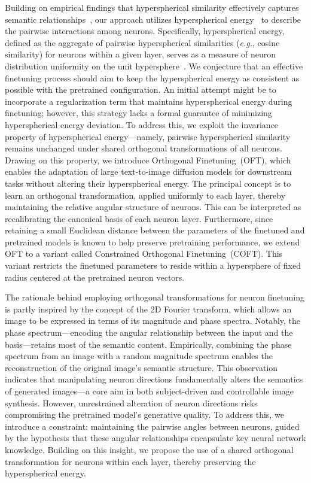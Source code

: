 Building on empirical findings that hyperspherical similarity effectively captures semantic relationships~\cite{liu2017deep,liu2018decoupled,chen2020angular}, our approach utilizes hyperspherical energy~\cite{liu2018learning} to describe the pairwise interactions among neurons. Specifically, hyperspherical energy, defined as the aggregate of pairwise hyperspherical similarities (\emph{e.g.}, cosine similarity) for neurons within a given layer, serves as a measure of neuron distribution uniformity on the unit hypersphere~\cite{liu2021learning}. We conjecture that an effective finetuning process should aim to keep the hyperspherical energy as consistent as possible with the pretrained configuration. An initial attempt might be to incorporate a regularization term that maintains hyperspherical energy during finetuning; however, this strategy lacks a formal guarantee of minimizing hyperspherical energy deviation. To address this, we exploit the invariance property of hyperspherical energy—namely, pairwise hyperspherical similarity remains unchanged under shared orthogonal transformations of all neurons. Drawing on this property, we introduce Orthogonal Finetuning~(OFT), which enables the adaptation of large text-to-image diffusion models for downstream tasks without altering their hyperspherical energy. The principal concept is to learn an orthogonal transformation, applied uniformly to each layer, thereby maintaining the relative angular structure of neurons. This can be interpreted as recalibrating the canonical basis of each neuron layer. Furthermore, since retaining a small Euclidean distance between the parameters of the finetuned and pretrained models is known to help preserve pretraining performance, we extend OFT to a variant called Constrained Orthogonal Finetuning~(COFT). This variant restricts the finetuned parameters to reside within a hypersphere of fixed radius centered at the pretrained neuron vectors.

The rationale behind employing orthogonal transformations for neuron finetuning is partly inspired by the concept of the 2D Fourier transform, which allows an image to be expressed in terms of its magnitude and phase spectra. Notably, the phase spectrum—encoding the angular relationship between the input and the basis—retains most of the semantic content. Empirically, combining the phase spectrum from an image with a random magnitude spectrum enables the reconstruction of the original image’s semantic structure. This observation indicates that manipulating neuron directions fundamentally alters the semantics of generated images—a core aim in both subject-driven and controllable image synthesis. However, unrestrained alteration of neuron directions risks compromising the pretrained model’s generative quality. To address this, we introduce a constraint: maintaining the pairwise angles between neurons, guided by the hypothesis that these angular relationships encapsulate key neural network knowledge. Building on this insight, we propose the use of a shared orthogonal transformation for neurons within each layer, thereby preserving the hyperspherical energy.

